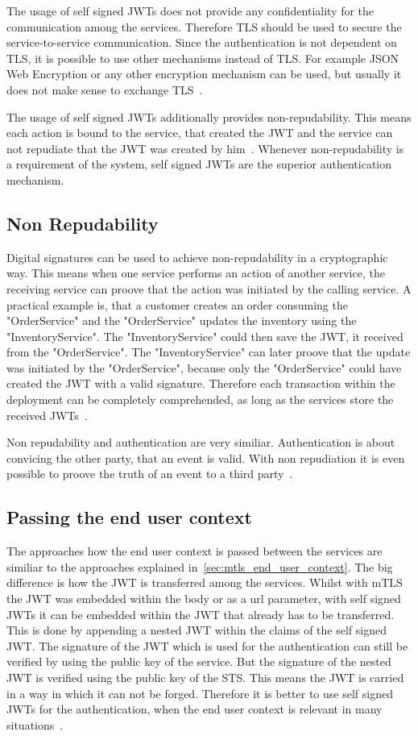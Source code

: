 The usage of self signed JWTs does not provide any confidentiality for the communication among the services.
Therefore TLS should be used to secure the service-to-service communication.
Since the authentication is not dependent on TLS, it is possible to use other mechanisms instead of TLS.
For example JSON Web Encryption or any other encryption mechanism can be used, but usually it does not make sense to exchange TLS~\cite{dias2020microservices}.

The usage of self signed JWTs additionally provides non-repudability.
This means each action is bound to the service, that created the JWT and the service can not repudiate that the JWT was created by him~\cite{dias2020microservices}.
Whenever non-repudability is a requirement of the system, self signed JWTs are the superior authentication mechanism.

\subsection{Non Repudability}
Digital signatures can be used to achieve non-repudability in a cryptographic way.
This means when one service performs an action of another service, the receiving service can proove that the action was initiated by the calling service.
A practical example is, that a customer creates an order consuming the "OrderService" and the "OrderService" updates the inventory using the "InventoryService".
The "InventoryService" could then save the JWT, it received from the "OrderService".
The "InventoryService" can later proove that the update was initiated by the "OrderService", because only the "OrderService" could have created the JWT with a valid signature.
Therefore each transaction within the deployment can be completely comprehended, as long as the services store the received JWTs~\cite{dias2020microservices}.

Non repudability and authentication are very similiar.
Authentication is about convicing the other party, that an event is valid.
With non repudiation it is even possible to proove the truth of an event to a third party~\cite{wu20131200}.

\subsection{Passing the end user context}
The approaches how the end user context is passed between the services are similiar to the approaches explained in~\ref{sec:mtls_end_user_context}.
The big difference is how the JWT is transferred among the services.
Whilst with mTLS the JWT was embedded within the body or as a url parameter, with self signed JWTs it can be embedded within the JWT that already has to be transferred.
This is done by appending a nested JWT within the claims of the self signed JWT.
The signature of the JWT which is used for the authentication can still be verified by using the public key of the service.
But the signature of the nested JWT is verified using the public key of the STS.
This means the JWT is carried in a way in which it can not be forged.
Therefore it is better to use self signed JWTs for the authentication, when the end user context is relevant in many situations~\cite{dias2020microservices}.


